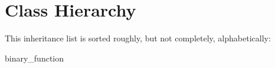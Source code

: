 \section{Class Hierarchy}
This inheritance list is sorted roughly, but not completely, alphabetically\+:\begin{DoxyCompactList}
\item binary\+\_\+function\begin{DoxyCompactList}
\item {}
\begin{DoxyCompactList}
\item {}
\item {}
\item {}
\end{DoxyCompactList}
\end{DoxyCompactList}
\item {}
\item {}
\end{DoxyCompactList}

